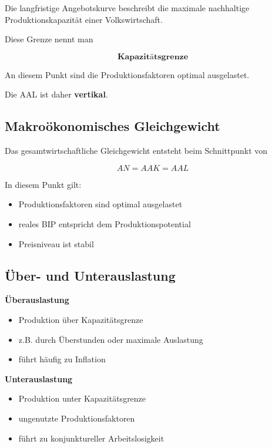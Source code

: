 Die langfristige Angebotskurve beschreibt die maximale nachhaltige
Produktionskapazität einer Volkswirtschaft.

Diese Grenze nennt man

\[
    \textbf{Kapazitätsgrenze}
\]

An diesem Punkt sind die Produktionsfaktoren optimal ausgelastet.

Die AAL ist daher \textbf{vertikal}.


\subsection{Makroökonomisches Gleichgewicht}

Das gesamtwirtschaftliche Gleichgewicht entsteht beim Schnittpunkt von

\[
    AN = AAK = AAL
\]

In diesem Punkt gilt:

\begin{itemize}
    \item Produktionsfaktoren sind optimal ausgelastet
    \item reales BIP entspricht dem Produktionspotential
    \item Preisniveau ist stabil
\end{itemize}


\subsection{Über- und Unterauslastung}

\textbf{Überauslastung}

\begin{itemize}
    \item Produktion über Kapazitätsgrenze
    \item z.B. durch Überstunden oder maximale Auslastung
    \item führt häufig zu Inflation
\end{itemize}

\textbf{Unterauslastung}

\begin{itemize}
    \item Produktion unter Kapazitätsgrenze
    \item ungenutzte Produktionsfaktoren
    \item führt zu konjunktureller Arbeitslosigkeit
\end{itemize}